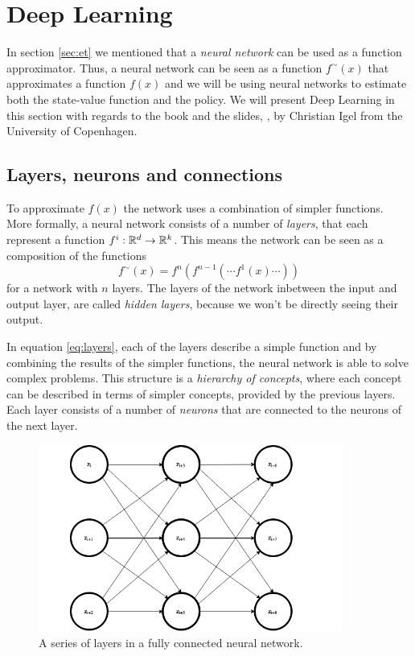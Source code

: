 \documentclass[11pt]{article}
\begin{document}
\maketitle

\section{Deep Learning}\label{sec:deep_learning}

In section \ref{sec:et} we mentioned that
a \textit{neural network} can be used as a function approximator.
Thus, a neural network can be seen as a function $f^\sim(x)$ that approximates a
function $f(x)$ and we will be using neural networks to estimate
both the state-value function and the policy.
We will present Deep Learning in this section with regards to the book \cite{DeepLearningBook} and the slides, \cite{IgelConv}, by Christian Igel
from the University of Copenhagen.

\subsection{Layers, neurons and connections}\label{sec:lnc}

To approximate $f(x)$ the network uses a combination of simpler functions.
More formally, a neural network consists of a number of \textit{layers},
that each represent a function $f^i : \mathbb{R}^{d} \to \mathbb{R}^k$.
This means the network can be seen as a composition of the functions
\begin{equation}\label{eq:layers}
    f^\sim(x) = f^n(f^{n-1}( \cdots f^1(x) \cdots))
\end{equation}
for a network with $n$ layers.
The layers of the network inbetween the input and output layer, are called
\textit{hidden layers}, because we won't be directly seeing their output.

In equation \ref{eq:layers}, each of the layers describe a simple function
and by combining the results of the simpler functions, the neural network
is able to solve complex problems.
This structure is a \textit{hierarchy of concepts}, where each concept can be described in terms
of simpler concepts, provided by the previous layers.
Each layer consists of a number of \textit{neurons} that are connected to the
neurons of the next layer.
\begin{figure}[!h]
    \centering
    \includegraphics[width=10cm]{include/layers.png}
    \caption{A series of layers in a fully connected neural network.}
    \label{fig:layers}
\end{figure}
\end{document}
